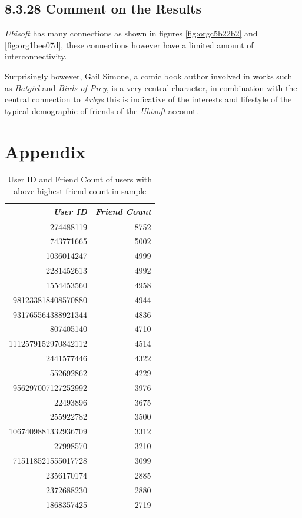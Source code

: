 \documentclass[11pt]{article}
\begin{document}
\subsection{8.3.28 Comment on the Results}
\label{sec:orged05c20}
\emph{Ubisoft} has many connections as shown in figures \ref{fig:orgc5b22b2} and \ref{fig:org1bee07d}, these connections however have a limited amount of interconnectivity.

Surprisingly however, Gail Simone, a comic book author involved in works such as \emph{Batgirl} and \emph{Birds of Prey}, is a very central character, in combination with the central connection to \emph{Arbys} this is indicative of the interests and lifestyle of the typical demographic of friends of the \emph{Ubisoft} account.
\section{Appendix}
\label{sec:orgb835f61}

\begin{table}[htbp]
\caption{\label{tab:org5efa4d1}User ID and Friend Count of users with above highest friend count in sample}
\centering
\begin{tabular}{rr}
\textbf{\emph{User ID}} & \textbf{\emph{Friend Count}}\\
\hline
274488119 & 8752\\
743771665 & 5002\\
1036014247 & 4999\\
2281452613 & 4992\\
1554453560 & 4958\\
981233818408570880 & 4944\\
931765564388921344 & 4836\\
807405140 & 4710\\
1112579152970842112 & 4514\\
2441577446 & 4322\\
552692862 & 4229\\
956297007127252992 & 3976\\
22493896 & 3675\\
255922782 & 3500\\
1067409881332936709 & 3312\\
27998570 & 3210\\
715118521555017728 & 3099\\
2356170174 & 2885\\
2372688230 & 2880\\
1868357425 & 2719\\
\end{tabular}
\end{table}
\end{document}
